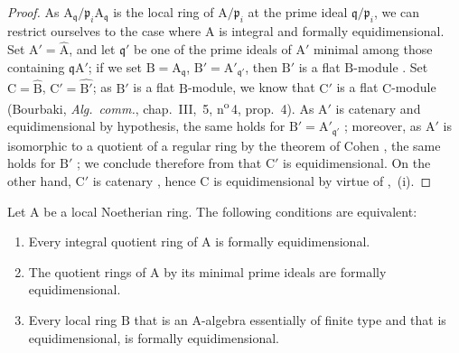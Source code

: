 \begin{proof}
As $\mathrm{A}_\mathfrak{q}/\mathfrak{p}_i\mathrm{A}_\mathfrak{q}$ is the local ring of $\mathrm{A}/\mathfrak{p}_i$ at the prime ideal $\mathfrak{q}/\mathfrak{p}_i$, we can restrict ourselves to the case where $\mathrm{A}$ is integral and formally equidimensional.
Set $\mathrm{A}'=\widehat{\mathrm{A}}$, and let $\mathfrak{q}'$ be one of the prime ideals of $\mathrm{A}'$ minimal among those containing $\mathfrak{q}\mathrm{A}'$; if we set $\mathrm{B}=\mathrm{A}_\mathfrak{q}$, $\mathrm{B}'=\mathrm{A}'_{\mathfrak{q}'}$, then $\mathrm{B}'$ is a flat $\mathrm{B}$-module .
Set $\mathrm{C}=\widehat{\mathrm{B}}$, $\mathrm{C}'=\widehat{\mathrm{B}'}$; as $\mathrm{B}'$ is a flat $\mathrm{B}$-module, we know that $\mathrm{C}'$ is a flat $\mathrm{C}$-module (Bourbaki, \emph{Alg.\ comm.}, chap.~III, \textsection\,5, n\textsuperscript{o}\,4, prop.~4).
As $\mathrm{A}'$ is catenary  and equidimensional by hypothesis, the same holds for $\mathrm{B}'=\mathrm{A}'_{\mathfrak{q}'}$ ; moreover, as $\mathrm{A}'$ is isomorphic to a quotient of a regular ring by the theorem of Cohen , the same holds for $\mathrm{B}'$ ; we conclude therefore from  that $\mathrm{C}'$ is equidimensional.
On the other hand, $\mathrm{C}'$ is catenary , hence $\mathrm{C}$ is equidimensional by virtue of ,~(i).
\end{proof}

\begin{theorem}[7.1.8]
\label{IV.7.1.8}
Let $\mathrm{A}$ be a local Noetherian ring.
The following conditions are equivalent:
\begin{enumerate}[label=\emph{\alph*)}]
  \item Every integral quotient ring of $\mathrm{A}$ is formally equidimensional.
  \item The quotient rings of $\mathrm{A}$ by its minimal prime ideals are formally equidimensional.
  \item Every local ring $\mathrm{B}$ that is an A-algebra essentially of finite type  and that is equidimensional, is formally equidimensional.
\end{enumerate}
\end{theorem}

